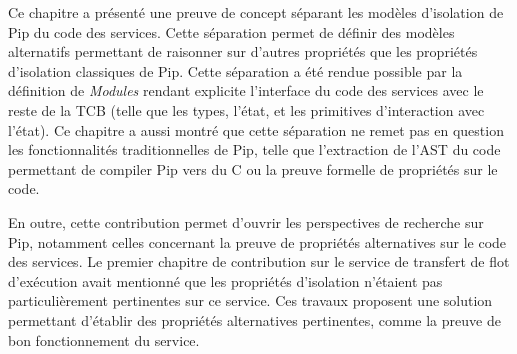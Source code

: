 		Ce chapitre a présenté une preuve de concept séparant les modèles d'isolation de Pip du code des services. Cette séparation permet de définir des modèles alternatifs permettant de raisonner sur d'autres propriétés que les propriétés d'isolation classiques de Pip. Cette séparation a été rendue possible par la définition de \emph{Modules} rendant explicite l'interface du code des services avec le reste de la TCB (telle que les types, l'état, et les primitives d'interaction avec l'état). Ce chapitre a aussi montré que cette séparation ne remet pas en question les fonctionnalités traditionnelles de Pip, telle que l'extraction de l'AST du code permettant de compiler Pip vers du C ou la preuve formelle de propriétés sur le code.

		En outre, cette contribution permet d'ouvrir les perspectives de recherche sur Pip, notamment celles concernant la preuve de propriétés alternatives sur le code des services. Le premier chapitre de contribution sur le service de transfert de flot d'exécution avait mentionné que les propriétés d'isolation n'étaient pas particulièrement pertinentes sur ce service. Ces travaux proposent une solution permettant d'établir des propriétés alternatives pertinentes, comme la preuve de bon fonctionnement du service.
